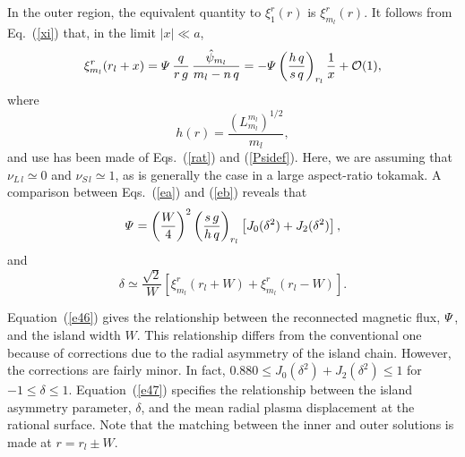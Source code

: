 \documentclass[12pt,prb,aps]{revtex4-1}
\begin{document}
In the outer region, the equivalent quantity to $\xi_1^r(r)$ is $\xi_{m_{l}}^r(r)$.  It follows from Eq.~(\ref{xi}) that, in the limit $|x|\ll a$, 
\begin{equation}\label{eb}
\xi_{m_{l}}^r(r_{l}+x)={\mit\Psi}\,\frac{q}{r\,g}\,\frac{\hat{\psi}_{m_{l}}}{m_{l}-n\,q}
= -{\mit\Psi}\left(\frac{h\,q}{s\,q}\right)_{r_l}\frac{1}{x} + {\cal O}(1),
\end{equation}
where 
\begin{equation}
h(r) = \frac{(L_{m_{l}}^{m_{l}})^{1/2}}{m_{l}},
\end{equation}
and use has been made of Eqs.~(\ref{rat}) and (\ref{Psidef}). Here, we are assuming that $\nu_{L\,l}\simeq 0$ and $\nu_{S\,l}\simeq 1$,
as is generally the case in a large aspect-ratio tokamak. 
A comparison between Eqs.~(\ref{ea}) and (\ref{eb}) reveals that
\begin{equation}\label{e46}
{\mit\Psi} = \left(\frac{W}{4}\right)^2\left(\frac{s\,g}{h\,q}\right)_{r_{l}}\left[J_0(\delta^2)+ J_2(\delta^2)\right],
\end{equation}
and
\begin{equation}\label{e47}
\delta \simeq \frac{\sqrt{2}}{W}\left[\xi_{m_{l}}^r(r_{l}+W)+\xi_{m_{l}}^r(r_{l}-W)\right].
\end{equation}

Equation~(\ref{e46}) gives the relationship between the reconnected magnetic flux, ${\mit\Psi}$, and the island width $W$. This relationship
differs from the conventional one\,\cite{ntm1} because of corrections due to the radial asymmetry of the island chain. However, the corrections are fairly
minor. In fact, $0.880\leq J_0(\delta^2)+ J_2(\delta^2)\leq 1$ for $-1\leq \delta\leq 1$. Equation~(\ref{e47}) specifies the relationship between the
island asymmetry parameter, $\delta$,  and the mean radial plasma displacement at the rational surface. Note that the matching
between the inner and outer solutions is made at $r=r_{l}\pm W$. 
\end{document}
